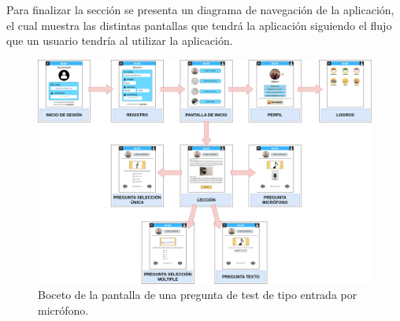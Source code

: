 Para finalizar la sección se presenta un diagrama de navegación de la aplicación, el cual muestra las distintas pantallas que tendrá la aplicación siguiendo el flujo que un usuario tendría al utilizar la aplicación.
\begin{figure}[H]
    \centering
    \centerline{\includegraphics[width=1.2\textwidth]{imagenes/c6/diagrambocetos.png}}
    \caption{Boceto de la pantalla de una pregunta de test de tipo entrada por micrófono.}
    \label{fig:microfono}
\end{figure}

